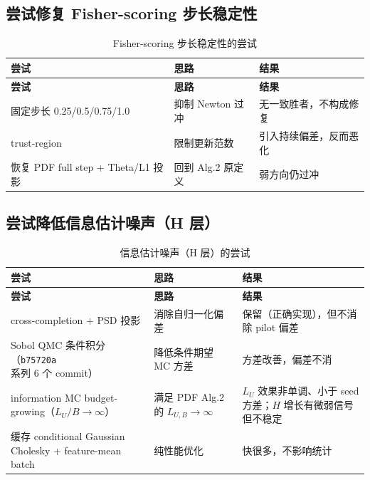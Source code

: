 \documentclass[11pt,a4paper]{ctexart}
\newcommand{\hcell}[1]{\textcolor{hlblue!85!black}{\bfseries #1}}
\begin{document}
\subsection{尝试修复 Fisher-scoring 步长稳定性}
\begin{longtable}{@{}L{4.2cm}L{4.6cm}L{6.2cm}@{}}
  \caption{Fisher-scoring 步长稳定性的尝试}\label{tbl:scoring}\\
  \toprule[1.4pt]
  \hcell{尝试} & \hcell{思路} & \hcell{结果} \\
  \midrule[0.8pt]
  \endfirsthead
  \toprule[1.4pt]
  \hcell{尝试} & \hcell{思路} & \hcell{结果} \\
  \midrule[0.8pt]
  \endhead
  \bottomrule[1.4pt]
  \endfoot
  固定步长 0.25/0.5/0.75/1.0 & 抑制 Newton 过冲 & 无一致胜者，不构成修复 \\
  trust-region & 限制更新范数 & 引入持续偏差，反而恶化 \\
  恢复 PDF full step + Theta/L1 投影 & 回到 Alg.2 原定义 & 弱方向仍过冲 \\
  \bottomrule[1.4pt]
\end{longtable}

\subsection{尝试降低信息估计噪声（H 层）}
\begin{longtable}{@{}L{4.2cm}L{4.6cm}L{6.2cm}@{}}
  \caption{信息估计噪声（H 层）的尝试}\label{tbl:info}\\
  \toprule[1.4pt]
  \hcell{尝试} & \hcell{思路} & \hcell{结果} \\
  \midrule[0.8pt]
  \endfirsthead
  \toprule[1.4pt]
  \hcell{尝试} & \hcell{思路} & \hcell{结果} \\
  \midrule[0.8pt]
  \endhead
  \bottomrule[1.4pt]
  \endfoot
  cross-completion + PSD 投影 & 消除自归一化偏差 & 保留（正确实现），但不消除 pilot 偏差 \\
  Sobol QMC 条件积分（\texttt{b75720a} 系列 6 个 commit） & 降低条件期望 MC 方差 & 方差改善，偏差不消 \\
  information MC budget-growing（$L_U/B\to\infty$） & 满足 PDF Alg.2 的 $L_{U,B}\to\infty$ & $L_U$ 效果非单调、小于 seed 方差；$H$ 增长有微弱信号但不稳定 \\
  缓存 conditional Gaussian Cholesky + feature-mean batch & 纯性能优化 & 快很多，不影响统计 \\
  \bottomrule[1.4pt]
\end{longtable}
\end{document}
